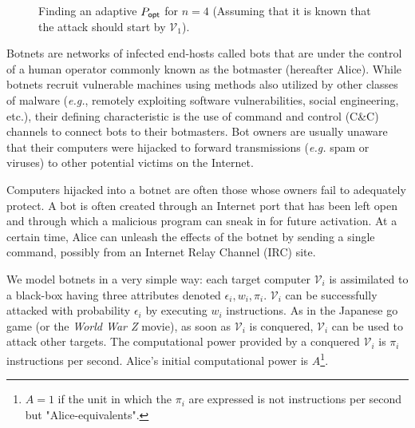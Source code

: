 \documentclass[11pt]{llncs}
\newcommand{\qm}{\raisebox{0.5ex}{\tiny ?}}
\begin{document}
\begin{figure}
\begin{center}
\begin{scaletikzpicturetowidth}{\textwidth}
\end{scaletikzpicturetowidth}
\end{center}
\caption{Finding an adaptive $P_{\mbox{\scriptsize {\sf opt}}}$ for $n=4$ (Assuming that it is known that the attack should start by $\mathcal{V}_1$).}
\label{dig1}
\end{figure}

Botnets are networks of infected end-hosts called bots that are under the control of a human operator commonly known as the botmaster (hereafter Alice). While botnets recruit vulnerable machines using methods also utilized by other classes of malware ({\sl e.g.}, remotely exploiting software vulnerabilities, social engineering, etc.), their defining characteristic is the use of command and control (C\&C) channels to connect bots to their botmasters. Bot owners are usually unaware that their computers were hijacked to forward transmissions ({\sl e.g.} spam or viruses) to other potential victims on the Internet.\smallskip

Computers hijacked into a botnet are often those whose owners fail to adequately protect. A bot is often created through an Internet port that has been left open and through which a malicious program can sneak in for future activation. At a certain time, Alice can unleash the effects of the botnet by sending a single command, possibly from an Internet Relay Channel (IRC) site.\smallskip

We model botnets in a very simple way: each target computer $\mathcal{V}_i$ is assimilated to a black-box having three attributes denoted $\epsilon_i,w_i,\pi_i$. $\mathcal{V}_i$ can be successfully attacked with probability $\epsilon_i$ by executing $w_i$ instructions. As in the Japanese go game (or the {\sl World War Z} movie), as soon as $\mathcal{V}_i$ is conquered, $\mathcal{V}_i$ can be used to attack other targets. The computational power provided by a conquered $\mathcal{V}_i$ is $\pi_i$ instructions per second. Alice's initial computational power is $A$\footnote{$A=1$ if the unit in which the $\pi_i$ are expressed is not instructions per second but "Alice-equivalents".}.\smallskip
\end{document}
